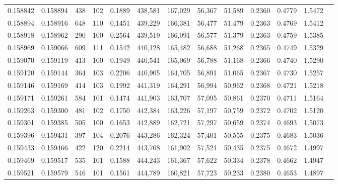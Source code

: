 \begin{tabular}{rrrrrrrrrrrrr}
0.158842 & 0.158894 &   438 & 102 &                                     0.1889 & 438,581 & 167,029 &  56,367 &  51,589 & 0.2360 & 0.4779 & 1.5472 \\
0.158894 & 0.158916 &   648 & 110 &                                     0.1451 & 439,229 & 166,381 &  56,477 &  51,479 & 0.2363 & 0.4769 & 1.5412 \\
0.158918 & 0.158962 &   290 & 100 &                                     0.2564 & 439,519 & 166,091 &  56,577 &  51,379 & 0.2363 & 0.4759 & 1.5385 \\
0.158969 & 0.159066 &   609 & 111 &                                     0.1542 & 440,128 & 165,482 &  56,688 &  51,268 & 0.2365 & 0.4749 & 1.5329 \\
0.159070 & 0.159119 &   413 & 100 &                                     0.1949 & 440,541 & 165,069 &  56,788 &  51,168 & 0.2366 & 0.4740 & 1.5290 \\
0.159120 & 0.159144 &   364 & 103 &                                     0.2206 & 440,905 & 164,705 &  56,891 &  51,065 & 0.2367 & 0.4730 & 1.5257 \\
0.159146 & 0.159169 &   414 & 103 &                                     0.1992 & 441,319 & 164,291 &  56,994 &  50,962 & 0.2368 & 0.4721 & 1.5218 \\
0.159171 & 0.159261 &   584 & 101 &                                     0.1474 & 441,903 & 163,707 &  57,095 &  50,861 & 0.2370 & 0.4711 & 1.5164 \\
0.159263 & 0.159300 &   481 & 102 &                                     0.1750 & 442,384 & 163,226 &  57,197 &  50,759 & 0.2372 & 0.4702 & 1.5120 \\
0.159301 & 0.159385 &   505 & 100 &                                     0.1653 & 442,889 & 162,721 &  57,297 &  50,659 & 0.2374 & 0.4693 & 1.5073 \\
0.159396 & 0.159431 &   397 & 104 &                                     0.2076 & 443,286 & 162,324 &  57,401 &  50,555 & 0.2375 & 0.4683 & 1.5036 \\
0.159433 & 0.159466 &   422 & 120 &                                     0.2214 & 443,708 & 161,902 &  57,521 &  50,435 & 0.2375 & 0.4672 & 1.4997 \\
0.159469 & 0.159517 &   535 & 101 &                                     0.1588 & 444,243 & 161,367 &  57,622 &  50,334 & 0.2378 & 0.4662 & 1.4947 \\
0.159521 & 0.159579 &   546 & 101 &                                     0.1561 & 444,789 & 160,821 &  57,723 &  50,233 & 0.2380 & 0.4653 & 1.4897 \\

\end{tabular}
